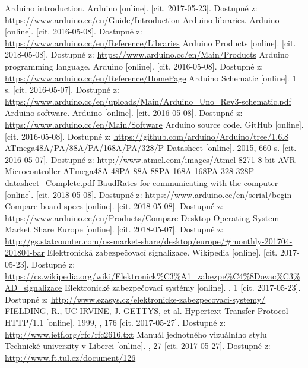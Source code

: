 \documentclass[FM,DP]{tulthesis}  %
\begin{document}
\begin{thebibliography}{10}
Arduino introduction. Arduino [online]. [cit. 2017-05-23]. Dostupné z: \url{https://www.arduino.cc/en/Guide/Introduction}
Arduino libraries. Arduino [online]. [cit. 2016-05-08]. Dostupné z: \url{https://www.arduino.cc/en/Reference/Libraries}
Arduino Products [online]. [cit. 2018-05-08]. Dostupné z: \url{https://www.arduino.cc/en/Main/Products}
Arduino programming language. Arduino [online]. [cit. 2016-05-08]. Dostupné z: \url{https://www.arduino.cc/en/Reference/HomePage}
Arduino Schematic [online]. 1 s. [cit. 2016-05-07]. Dostupné z: \url{https://www.arduino.cc/en/uploads/Main/Arduino\_Uno\_Rev3-schematic.pdf}
 Arduino software. Arduino [online]. [cit. 2016-05-08]. Dostupné z: \url{https://www.arduino.cc/en/Main/Software}
Arduino source code. GitHub [online]. [cit. 2016-05-08]. Dostupné z: \url{https://github.com/arduino/Arduino/tree/1.6.8}
ATmega48A/PA/88A/PA/168A/PA/328/P Datasheet [online]. 2015, 660 s. [cit. 2016-05-07]. Dostupné z: http://www.atmel.com/images/Atmel-8271-8-bit-AVR-Microcontroller-ATmega48A-48PA-88A-88PA-168A-168PA-328-328P\_ datasheet\_Complete.pdf
BaudRates for communicating with the computer [online]. [cit. 2018-05-08]. Dostupné z: \url{https://www.arduino.cc/en/serial/begin}
Compare board specs [online]. [cit. 2018-05-08]. Dostupné z: \url{https://www.arduino.cc/en/Products/Compare}
Desktop Operating System Market Share Europe [online]. [cit. 2018-05-07]. Dostupné z: \url{http://gs.statcounter.com/os-market-share/desktop/europe/#monthly-201704-201804-bar}
Elektronická zabezpečovací signalizace. Wikipedia [online]. [cit. 2017-05-23]. Dostupné z: \url{https://cs.wikipedia.org/wiki/Elektronick\%C3\%A1\_zabezpe\%C4\%8Dovac\%C3\%AD_signalizace}
Elektronické zabezpečovací systémy [online]. , 1 [cit. 2017-05-23]. Dostupné z: \url{http://www.ezasys.cz/elektronicke-zabezpecovaci-systemy/}
FIELDING, R., UC IRVINE, J. GETTYS, et al. Hypertext Transfer Protocol -- HTTP/1.1 [online]. 1999, , 176 [cit. 2017-05-27]. Dostupné z: \url{http://www.ietf.org/rfc/rfc2616.txt}
Manuál jednotného vizuálního stylu Technické univerzity v Liberci [online]. , 27 [cit. 2017-05-27]. Dostupné z: \url{http://www.ft.tul.cz/document/126}

\end{thebibliography}
\end{document}
